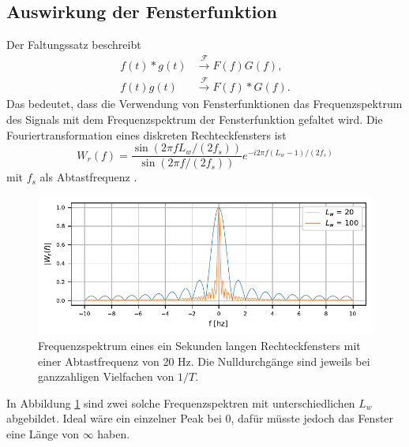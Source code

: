\subsection{Auswirkung der Fensterfunktion}
Der Faltungssatz beschreibt 
\begin{align}
    f(t) * g(t)& \xrightarrow{\mathscr{F}} F(f)G(f),\\
    f(t) g(t)&\xrightarrow{\mathscr{F}}F(f) * G(f).
\end{align}
Das bedeutet, dass die Verwendung von Fensterfunktionen das Frequenzspektrum
des Signals mit dem Frequenzspektrum der Fensterfunktion gefaltet wird.
Die Fouriertransformation eines diskreten Rechteckfensters ist 
\begin{equation}
    W_r(f) = \frac{\sin(2 \pi f  L_w / (2 f_s))}{\sin(2 \pi f / (2 f_s))} e^{-i 2 \pi f (L_w-1)/(2f_s)}
\end{equation}
mit $f_s$ als Abtastfrequenz \cite{sonogramm:digsig}.
\begin{figure}
    \centering
    \includegraphics{papers/sonogramm/images/rect_freq.pdf}
    \caption{Frequenzspektrum eines ein Sekunden langen Rechteckfensters mit einer Abtastfrequenz von 20 Hz. Die Nulldurchgänge sind jeweils bei ganzzahligen Vielfachen
    von $1/T$.
    \label{sonogramm:rectfreq}
    }
\end{figure}
In Abbildung \ref{sonogramm:rectfreq} sind zwei solche Frequenzspektren mit unterschiedlichen $L_w$ abgebildet.
Ideal wäre ein einzelner Peak bei 0, dafür müsste jedoch das Fenster eine Länge von $\infty$ haben.

